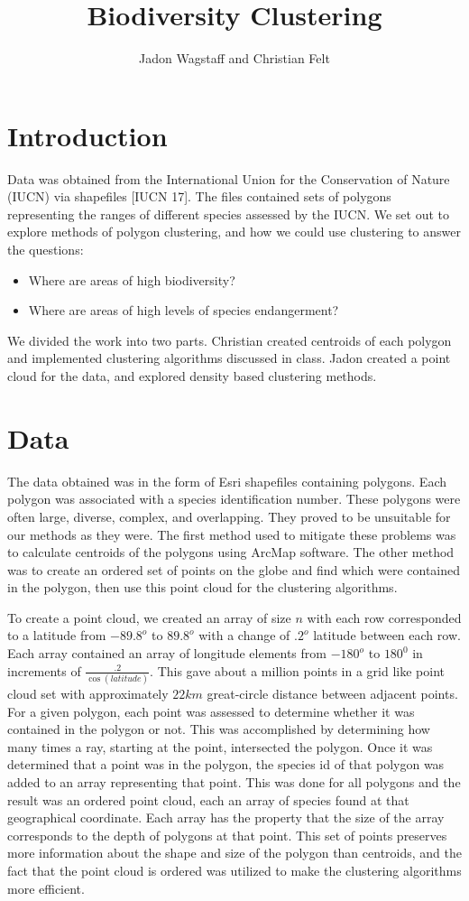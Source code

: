 \documentclass[11pt, fullpage,letterpaper]{article}
\title{Biodiversity Clustering}
\author{Jadon Wagstaff and Christian Felt}
\begin{document}
	\maketitle
	
	\section{Introduction}
		Data was obtained from the International Union for the Conservation of Nature (IUCN) via shapefiles [IUCN 17]. The files contained sets of polygons representing the ranges of different species assessed by the IUCN. We set out to explore methods of polygon clustering, and how we could use clustering to answer the questions:
		\begin{itemize}
			\item Where are areas of high biodiversity?
			\item Where are areas of high levels of species endangerment?
		\end{itemize} 
		We divided the work into two parts. Christian created centroids of each polygon and implemented clustering algorithms discussed in class. Jadon created a point cloud for the data, and explored density based clustering methods.
	
	\section{Data}
		The data obtained was in the form of Esri shapefiles containing polygons. Each polygon was associated with a species identification number. These polygons were often large, diverse, complex, and overlapping. They proved to be unsuitable for our methods as they were. The first method used to mitigate these problems was to calculate centroids of the polygons using ArcMap software. The other method was to create an ordered set of points on the globe and find which were contained in the polygon, then use this point cloud for the clustering algorithms.
		
		To create a point cloud, we created an array of size $n$ with each row corresponded to a latitude from $-89.8^o$ to $89.8^o$ with a change of $.2^o$ latitude between each row. Each array contained an array of longitude elements from		 $-180^o$ to $180^0$ in increments of $\frac{.2}{\cos(latitude)}$. This gave about a million points in a grid like point cloud set with approximately $22km$ great-circle distance between adjacent points. For a given polygon, each point was assessed to determine whether it was contained in the polygon or not. This was accomplished by determining how many times a ray, starting at the point, intersected the polygon. Once it was determined that a point was in the polygon, the species id of that polygon was added to an array representing that point. This was done for all polygons and the result was an ordered point cloud, each an array of species found at that geographical coordinate. Each array has the property that the size of the array corresponds to the depth of polygons at that point. This set of points preserves more information about the shape and size of the polygon than centroids, and the fact that the point cloud is ordered was utilized to make the clustering algorithms more efficient.
		
\end{document}
